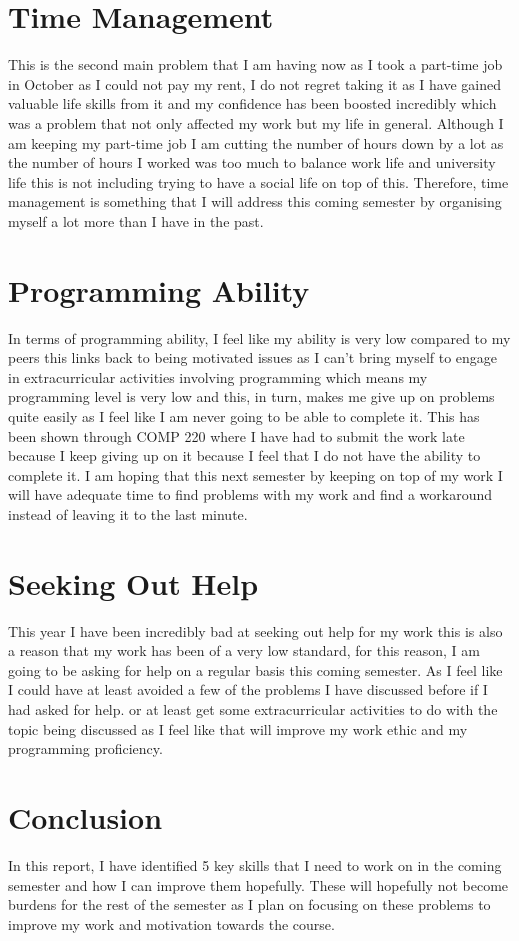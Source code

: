\documentclass[11pt]{scrartcl}
\begin{document}
\section {Time Management}
This is the second main problem that I am having now as I took a part-time job in October as I could not pay my rent, I do not regret taking it as I have gained valuable life skills from it and my confidence has been boosted incredibly which was a problem that not only affected my work but my life in general. Although I am keeping my part-time job I am cutting the number of hours down by a lot as the number of hours I worked was too much to balance work life and university life this is not including trying to have a social life on top of this. Therefore, time management is something that I will address this coming semester by organising myself a lot more than I have in the past.

\section {Programming Ability}
In terms of programming ability, I feel like my ability is very low compared to my peers this links back to being motivated issues as I can't bring myself to engage in extracurricular activities involving programming which means my programming level is very low and this, in turn, makes me give up on problems quite easily as I feel like I am never going to be able to complete it. This has been shown through COMP 220 where I have had to submit the work late because I keep giving up on it because I feel that I do not have the ability to complete it. I am hoping that this next semester by keeping on top of my work I will have adequate time to find problems with my work and find a workaround instead of leaving it to the last minute.

\section {Seeking Out Help}
This year I have been incredibly bad at seeking out help for my work this is also a reason that my work has been of a very low standard, for this reason, I am going to be asking for help on a regular basis this coming semester. As I feel like I could have at least avoided a few of the problems I have discussed before if I had asked for help. or at least get some extracurricular activities to do with the topic being discussed as I feel like that will improve my work ethic and my programming proficiency.

\section*{Conclusion}
In this report, I have identified 5 key skills that I need to work on in the coming semester and how I can improve them hopefully. These will hopefully not become burdens for the rest of the semester as I plan on focusing on these problems to improve my work and motivation towards the course.






\end{document}
